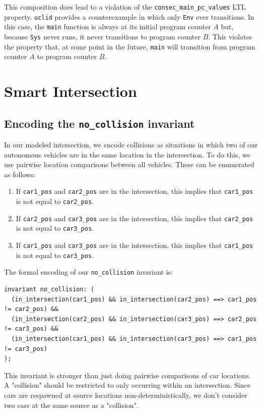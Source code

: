 \documentclass{article}
\newcommand{\code}[1]{\texttt{#1}}
\begin{document}
This composition does lead to a violation of the \code{consec\_main\_pc\_values} LTL property. \code{uclid} provides a counterexample in which only \code{Env} ever transitions. In this case, the \code{main} function is always at its initial program counter $A$ but, because \code{Sys} never runs, it never transitions to program counter $B$. This violates the property that, at some point in the future, \code{main} will transition from program counter $A$ to program counter $B$.

\section{Smart Intersection}

\subsection{Encoding the \code{no\_collision} invariant}

In our modeled intersection, we encode collisions as situations in which two of our autonomous vehicles are in the same location in the intersection. To do this, we use pairwise location comparisons between all vehicles. These can be enumerated as follows:

\begin{enumerate}
  \item If \code{car1\_pos} and \code{car2\_pos} are in the intersection, this implies that \code{car1\_pos} is not equal to \code{car2\_pos}.
  \item If \code{car2\_pos} and \code{car3\_pos} are in the intersection, this implies that \code{car2\_pos} is not equal to \code{car3\_pos}.
  \item If \code{car1\_pos} and \code{car3\_pos} are in the intersection, this implies that \code{car1\_pos} is not equal to \code{car3\_pos}.
\end{enumerate}

The formal encoding of our \code{no\_collision} invariant is:

\begin{lstlisting}
invariant no_collision: (
  (in_intersection(car1_pos) && in_intersection(car2_pos) ==> car1_pos != car2_pos) &&
  (in_intersection(car2_pos) && in_intersection(car3_pos) ==> car2_pos != car3_pos) &&
  (in_intersection(car1_pos) && in_intersection(car3_pos) ==> car1_pos != car3_pos)
);
\end{lstlisting}

This invariant is stronger than just doing pairwise comparisons of car locations. A "collision" should be restricted to only occurring within an intersection. Since cars are respawned at source locations non-deterministically, we don't consider two cars at the same source as a "collision".
\end{document}
